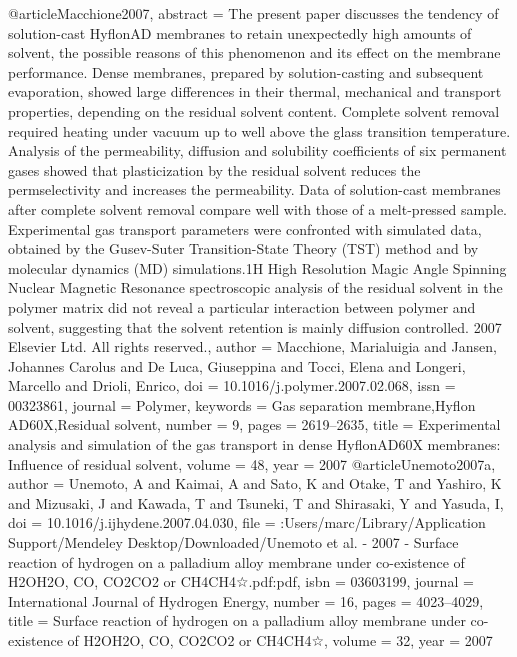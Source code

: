 @article{Macchione2007,
abstract = {The present paper discusses the tendency of solution-cast Hyflon{\textregistered}AD membranes to retain unexpectedly high amounts of solvent, the possible reasons of this phenomenon and its effect on the membrane performance. Dense membranes, prepared by solution-casting and subsequent evaporation, showed large differences in their thermal, mechanical and transport properties, depending on the residual solvent content. Complete solvent removal required heating under vacuum up to well above the glass transition temperature. Analysis of the permeability, diffusion and solubility coefficients of six permanent gases showed that plasticization by the residual solvent reduces the permselectivity and increases the permeability. Data of solution-cast membranes after complete solvent removal compare well with those of a melt-pressed sample. Experimental gas transport parameters were confronted with simulated data, obtained by the Gusev-Suter Transition-State Theory (TST) method and by molecular dynamics (MD) simulations.1H High Resolution Magic Angle Spinning Nuclear Magnetic Resonance spectroscopic analysis of the residual solvent in the polymer matrix did not reveal a particular interaction between polymer and solvent, suggesting that the solvent retention is mainly diffusion controlled. {\textcopyright} 2007 Elsevier Ltd. All rights reserved.},
author = {Macchione, Marialuigia and Jansen, Johannes Carolus and {De Luca}, Giuseppina and Tocci, Elena and Longeri, Marcello and Drioli, Enrico},
doi = {10.1016/j.polymer.2007.02.068},
issn = {00323861},
journal = {Polymer},
keywords = {Gas separation membrane,Hyflon AD60X,Residual solvent},
number = {9},
pages = {2619--2635},
title = {{Experimental analysis and simulation of the gas transport in dense Hyflon{\textregistered}AD60X membranes: Influence of residual solvent}},
volume = {48},
year = {2007}
}
@article{Unemoto2007a,
author = {Unemoto, A and Kaimai, A and Sato, K and Otake, T and Yashiro, K and Mizusaki, J and Kawada, T and Tsuneki, T and Shirasaki, Y and Yasuda, I},
doi = {10.1016/j.ijhydene.2007.04.030},
file = {:Users/marc/Library/Application Support/Mendeley Desktop/Downloaded/Unemoto et al. - 2007 - Surface reaction of hydrogen on a palladium alloy membrane under co-existence of H2OH2O, CO, CO2CO2 or CH4CH4☆.pdf:pdf},
isbn = {03603199},
journal = {International Journal of Hydrogen Energy},
number = {16},
pages = {4023--4029},
title = {{Surface reaction of hydrogen on a palladium alloy membrane under co-existence of H2OH2O, CO, CO2CO2 or CH4CH4☆}},
volume = {32},
year = {2007}
}
